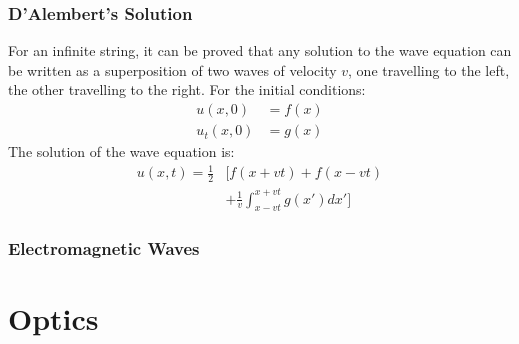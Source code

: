 \documentclass[11pt, letterpaper]{article}
\begin{document}
\begin{multicols*}{3}
\subsubsection{D'Alembert's Solution}
For an infinite string, it can be proved that any solution to the wave equation can be written as a superposition of two waves of velocity $v$, one travelling to the left, the other travelling to the right. For the initial conditions:
\begin{align*}
  u(x, 0) &= f(x) \\
  u_t(x, 0) &= g(x)
\end{align*}
The solution of the wave equation is:
\begin{align*}
  u(x, t) = \frac{1}{2} &\bigg[ f(x+vt) + f(x-vt)  \\
    &+ \frac{1}{v}\int_{x-vt}^{x+vt}g(x') dx' \bigg]
\end{align*}
\subsubsection{Electromagnetic Waves}

\section{Optics}

\end{multicols*}
\end{document}
